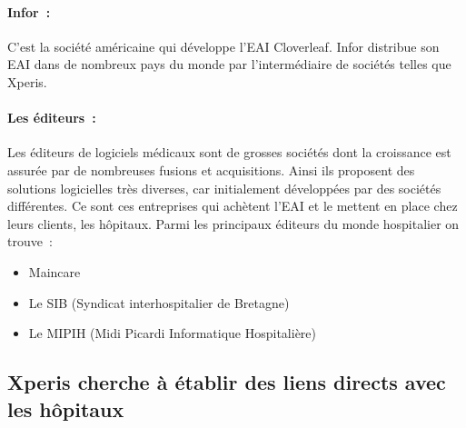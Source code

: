 			\paragraph{Infor~:}
			C'est la société américaine qui développe l'EAI Cloverleaf. Infor distribue
			son EAI dans de nombreux pays du monde par l'intermédiaire de sociétés
			telles que Xperis.
			
			\paragraph{Les éditeurs~:}
			Les éditeurs de logiciels médicaux sont de grosses sociétés dont la
			croissance est assurée par de nombreuses fusions et acquisitions. Ainsi ils
			proposent des solutions logicielles très diverses, car initialement
			développées par des sociétés différentes. Ce sont ces entreprises qui
			achètent l'EAI et le mettent en place chez leurs clients, les hôpitaux. Parmi
			les principaux éditeurs du monde hospitalier on trouve~:
			\begin{itemize}
				\item Maincare
				\item Le SIB (Syndicat interhospitalier de Bretagne)
				\item Le MIPIH (Midi Picardi Informatique Hospitalière)
			\end{itemize}
			
		\subsection{Xperis cherche à établir des liens directs avec les hôpitaux}
